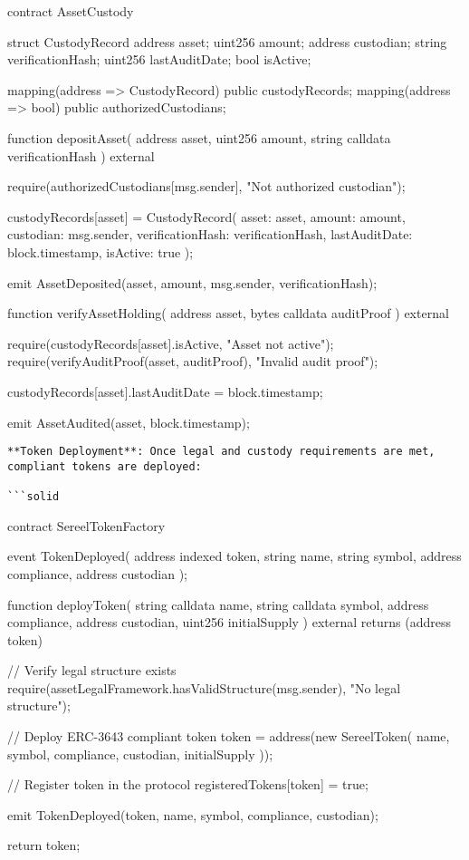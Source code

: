\documentclass[12pt]{article}
\begin{document}
contract AssetCustody {    struct CustodyRecord {        address asset;        uint256 amount;        address custodian;        string verificationHash;        uint256 lastAuditDate;        bool isActive;    }

    mapping(address => CustodyRecord) public custodyRecords;    mapping(address => bool) public authorizedCustodians;

    function depositAsset(        address asset,        uint256 amount,        string calldata verificationHash    ) external {        require(authorizedCustodians[msg.sender], "Not authorized custodian");

        custodyRecords[asset] = CustodyRecord({            asset: asset,            amount: amount,            custodian: msg.sender,            verificationHash: verificationHash,            lastAuditDate: block.timestamp,            isActive: true        });

        emit AssetDeposited(asset, amount, msg.sender, verificationHash);    }

    function verifyAssetHolding(        address asset,        bytes calldata auditProof    ) external {        require(custodyRecords[asset].isActive, "Asset not active");        require(verifyAuditProof(asset, auditProof), "Invalid audit proof");

        custodyRecords[asset].lastAuditDate = block.timestamp;

        emit AssetAudited(asset, block.timestamp);    }}
\begin{lstlisting}
**Token Deployment**: Once legal and custody requirements are met, compliant tokens are deployed:

```solid
\end{lstlisting}
contract SereelTokenFactory {    event TokenDeployed(        address indexed token,        string name,        string symbol,        address compliance,        address custodian    );

    function deployToken(        string calldata name,        string calldata symbol,        address compliance,        address custodian,        uint256 initialSupply    ) external returns (address token) {        // Verify legal structure exists        require(assetLegalFramework.hasValidStructure(msg.sender), "No legal structure");

        // Deploy ERC-3643 compliant token        token = address(new SereelToken(            name,            symbol,            compliance,            custodian,            initialSupply        ));

        // Register token in the protocol        registeredTokens[token] = true;

        emit TokenDeployed(token, name, symbol, compliance, custodian);

        return token;    }}
\end{document}
